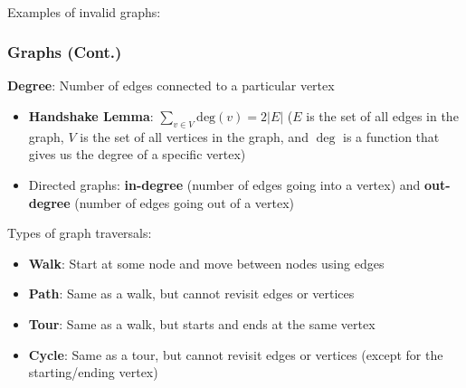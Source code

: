 \documentclass{beamer}
\begin{document}
\begin{frame}
\begin{tikzpicture}[->,auto,node distance=3cm,thick,main node/.style={circle,draw},scale=0.5]
    \end{tikzpicture}\\
    Examples of invalid graphs:\\
    \hspace{5pt}
\end{frame}

\begin{frame}
    \frametitle{Graphs (Cont.)}
    {\bf Degree}: Number of edges connected to a particular vertex
    \begin{itemize}
        \item {\bf Handshake Lemma}: $\sum_{v\in V}\text{deg}(v)=2|E|$ ($E$ is the set of all edges in the graph, $V$ is the set of all vertices in the graph, and $\deg$ is a function that gives us the degree of a specific vertex)
        \item Directed graphs: {\bf in-degree} (number of edges going into a vertex) and {\bf out-degree} (number of edges going out of a vertex)
    \end{itemize}
    Types of graph traversals:
    \begin{itemize}
        \item {\bf Walk}: Start at some node and move between nodes using edges
        \item {\bf Path}: Same as a walk, but cannot revisit edges or vertices
        \item {\bf Tour}: Same as a walk, but starts and ends at the same vertex
        \item{\bf Cycle}: Same as a tour, but cannot revisit edges or vertices (except for the starting/ending vertex)
    \end{itemize}
\end{frame}
\end{document}
